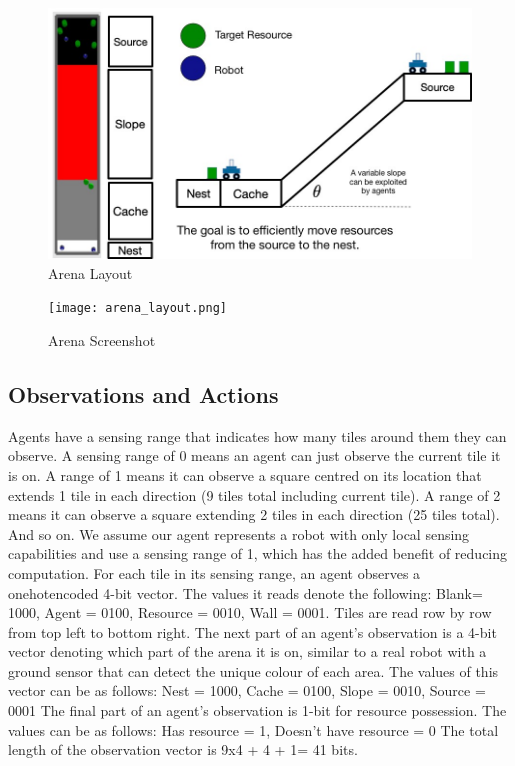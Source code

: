 \documentclass[12pt]{article}
\begin{document}
\begin{appendices}
\begin{figure}
	\centering
	\includegraphics[width=\textwidth]{arena.jpg}
	\caption{Arena Layout}
	\label{fig:arena}
\end{figure}

\begin{figure}
	\centering
	\texttt{[image: arena\_layout.png]}
	\caption{Arena Screenshot}
	\label{fig:arena_2}
\end{figure}

\subsection{Observations and Actions}\label{observation_space}

Agents have a sensing range that indicates how many tiles around them they can observe. 
A sensing range of 0 means an agent can just observe the current tile it is on. 
A range of 1 means it can observe a square centred  on its location that extends 1 tile in each direction (9 tiles total including current tile). 
A range of 2 means it can observe a square extending 2 tiles in each direction (25 tiles total). 
And so on.
We assume our agent represents a robot with only local sensing capabilities and use a sensing range of 1, which has the added benefit of reducing computation.
For each tile in its sensing range, an agent observes a onehotencoded 4-bit vector. 
The values it reads denote the following: Blank= 1000, Agent = 0100, Resource = 0010, Wall = 0001.
Tiles are read row by row from top left to bottom right. 
The next part of an agent's observation is a 4-bit vector denoting which part of the arena it is on, similar to a real robot with a ground sensor that can detect the unique colour of each area.
The values of this vector can be as follows: Nest = 1000, Cache = 0100, Slope = 0010, Source = 0001
The final part of an agent's observation is 1-bit for resource possession. 
The values can be as follows: Has resource = 1, Doesn’t have resource = 0
The total length of the observation vector is 9x4 + 4 + 1= 41 bits.\\


\end{appendices}
\end{document}
